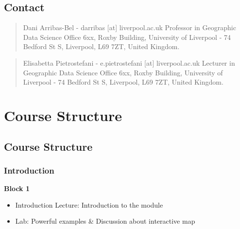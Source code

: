 \documentclass[
  letterpaper,
  DIV=11,
  numbers=noendperiod]{scrreprt}
\begin{document}
\hypertarget{contact}{%
\section*{Contact}\label{contact}}


\begin{quote}
Dani Arribas-Bel - darribas {[}at{]} liverpool.ac.uk Professor in
Geographic Data Science Office 6xx, Roxby Building, University of
Liverpool - 74 Bedford St S, Liverpool, L69 7ZT, United Kingdom.
\end{quote}

\begin{quote}
Elisabetta Pietrostefani - e.pietrostefani {[}at{]} liverpool.ac.uk
Lecturer in Geographic Data Science Office 6xx, Roxby Building,
University of Liverpool - 74 Bedford St S, Liverpool, L69 7ZT, United
Kingdom.
\end{quote}


\hypertarget{course-structure}{%
\chapter*{Course Structure}\label{course-structure}}


\hypertarget{course-structure-1}{%
\section*{Course Structure}\label{course-structure-1}}


\hypertarget{introduction}{%
\subsection*{Introduction}\label{introduction}}

\textbf{Block 1}

\begin{itemize}
\item
  Introduction Lecture: Introduction to the module
\item
  Lab: Powerful examples \& Discussion about interactive map
\end{itemize}
\end{document}
